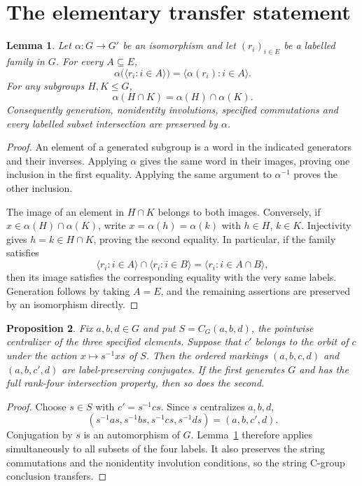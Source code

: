\documentclass[11pt]{article}
\newtheorem{lemma}{Lemma}
\newtheorem{proposition}[lemma]{Proposition}
\newcommand{\gen}[1]{\langle #1\rangle}
\begin{document}
\section*{The elementary transfer statement}

\begin{lemma}\label{lem:automorphism}
Let $\alpha:G\to G'$ be an isomorphism and let $(r_i)_{i\in E}$ be a
labelled family in $G$.  For every $A\subseteq E$,
\[
              \alpha\bigl(\gen{r_i:i\in A}\bigr)
                       =\gen{\alpha(r_i):i\in A}.
\]
For any subgroups $H,K\le G$,
\[
                       \alpha(H\cap K)=\alpha(H)\cap\alpha(K).
\]
Consequently generation, nonidentity involutions, specified commutations
and every labelled subset intersection are preserved by $\alpha$.
\end{lemma}
\begin{proof}
An element of a generated subgroup is a word in the indicated generators
and their inverses.  Applying $\alpha$ gives the same word in their
images, proving one inclusion in the first equality.  Applying the same
argument to $\alpha^{-1}$ proves the other inclusion.

The image of an element in $H\cap K$ belongs to both images.  Conversely,
if $x\in\alpha(H)\cap\alpha(K)$, write $x=\alpha(h)=\alpha(k)$ with
$h\in H$, $k\in K$.  Injectivity gives $h=k\in H\cap K$, proving the
second equality.  In particular, if the family satisfies
\[
 \gen{r_i:i\in A}\cap\gen{r_i:i\in B}
                      =\gen{r_i:i\in A\cap B},
\]
then its image satisfies the corresponding equality with the very same
labels.  Generation follows by taking $A=E$, and the remaining assertions
are preserved by an isomorphism directly.
\end{proof}

\begin{proposition}\label{prop:prefix}
Fix $a,b,d\in G$ and put $S=C_G(a,b,d)$, the pointwise centralizer of
the three specified elements.  Suppose that $c'$ belongs to the orbit
of $c$ under the action $x\mapsto s^{-1}xs$ of $S$.  Then the ordered
markings $(a,b,c,d)$ and $(a,b,c',d)$ are label-preserving conjugates.
If the first generates $G$ and has the full rank-four intersection
property, then so does the second.
\end{proposition}
\begin{proof}
Choose $s\in S$ with $c'=s^{-1}cs$.  Since $s$ centralizes $a,b,d$,
\[
 (s^{-1}as,s^{-1}bs,s^{-1}cs,s^{-1}ds)=(a,b,c',d).
\]
Conjugation by $s$ is an automorphism of $G$.  Lemma~\ref{lem:automorphism}
therefore applies simultaneously to all subsets of the four labels.
It also preserves the string commutations and the nonidentity involution
conditions, so the string C-group conclusion transfers.
\end{proof}
\end{document}
